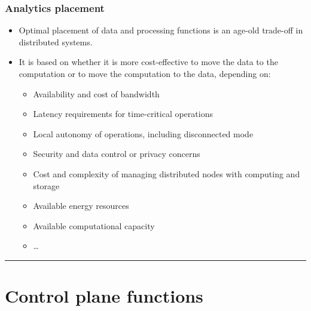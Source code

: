 \documentclass[a4paper, 12pt]{book} %
\begin{document}
\subsection{Analytics placement}\label{analytics-placement}

\begin{itemize}
\tightlist
\item
  Optimal placement of data and processing functions is an age-old
  trade-off in distributed systems.
\item
  It is based on whether it is more cost-effective to move the data to
  the computation or to move the computation to the data, depending on:

  \begin{itemize}
  \tightlist
  \item
    Availability and cost of bandwidth
  \item
    Latency requirements for time-critical operations
  \item
    Local autonomy of operations, including disconnected mode
  \item
    Security and data control or privacy concerns
  \item
    Cost and complexity of managing distributed nodes with computing and
    storage
  \item
    Available energy resources
  \item
    Available computational capacity
  \item
    \ldots{}
  \end{itemize}
\end{itemize}

\begin{center}\rule{0.5\linewidth}{0.5pt}\end{center}

\chapter{Control plane functions}\label{control-plane-functions}
\end{document}
